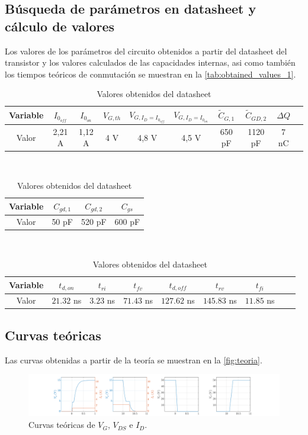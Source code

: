 \documentclass[e4_tp1_main.tex]{subfiles}
\begin{document}
\subsection{Búsqueda de parámetros en datasheet y cálculo de valores}

Los valores de los parámetros del circuito obtenidos a partir del datasheet del transistor y los valores calculados de las capacidades internas, asi como también los tiempos teóricos de conmutación se muestran en la \autoref{tab:obtained_values_1}.

\begin{table}[H]
\centering
\begin{tabular}{|c|c|c|c|c|c|c|c|c|c|}
\hline
Variable & $I_{0_{off}}$ & $I_{0_{on}}$ & $V_{G,th}$ & $V_{G,I_D=I_{0_{off}}}$   & $V_{G,I_D=I_{0_{on}}}$ & $\tilde{C}_{G,1}$ & $\tilde{C}_{GD,2}$ & $\Delta Q$  \\
\hline
Valor & 2,21 A & 1,12 A & 4 V & 4,8 V & 4,5 V & 650 pF & 1120 pF & 7 nC\\
\hline
\end{tabular}
\\
\begin{tabular}{|c|c|c|c|}
\hline
Variable & $C_{gd,1}$ & $C_{gd,2}$ & $C_{gs}$\\
\hline
Valor & 50 pF & 520 pF & 600 pF\\
\hline
\end{tabular}
\\
\begin{tabular}{|c|c|c|c|c|c|c|c|c|}
\hline
Variable & $t_{d,on}$ & $t_{ri}$ & $t_{fv}$ & $t_{d,off}$ & $t_{rv}$ & $t_{fi}$  \\
\hline
Valor & $21.32$ ns & $3.23$ ns & $71.43$ ns & $127.62$ ns & $145.83$ ns & $11.85$ ns\\
\hline
\end{tabular}	
\caption{Valores obtenidos del datasheet}
\label{tab:obtained_values_1}
\end{table}

\subsection{Curvas teóricas}
Las curvas obtenidas a partir de la teoría se muestran en la \autoref{fig:teoria}.

\begin{figure}[h]
  \centering
  \includegraphics[width=\linewidth]{images/ej1/curvas_teoria.png}
  \caption{Curvas teóricas de $V_G$, $V_{DS}$ e $I_D$.}
  \label{fig:teoria}
\end{figure}
\end{document}
